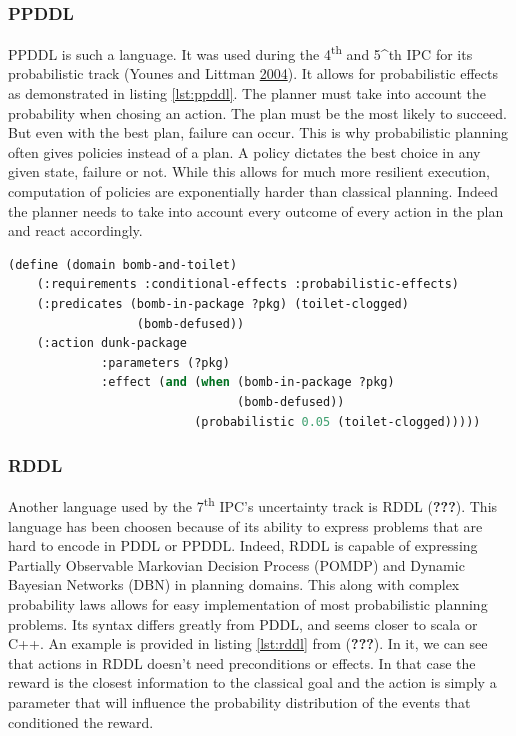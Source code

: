 \documentclass[11pt,a4paper,twoside,openright,titlepage,numbers=noenddot,headinclude,cleardoublepage=empty,openany]{scrreprt}
\theoremstyle{plain}
\theoremstyle{definition}
\theoremstyle{remark}
\begin{document}
\hypertarget{ppddl}{%
\subsubsection{PPDDL}\label{ppddl}}

PPDDL is such a language. It was used during the 4\textsuperscript{th}
and 5\^{}th IPC for its probabilistic track (Younes and Littman
\protect\hyperlink{ref-younes_ppddl_2004}{2004}). It allows for
probabilistic effects as demonstrated in listing \ref{lst:ppddl}. The
planner must take into account the probability when chosing an action.
The plan must be the most likely to succeed. But even with the best
plan, failure can occur. This is why probabilistic planning often gives
policies instead of a plan. A policy dictates the best choice in any
given state, failure or not. While this allows for much more resilient
execution, computation of policies are exponentially harder than
classical planning. Indeed the planner needs to take into account every
outcome of every action in the plan and react accordingly.

\begin{lstlisting}[language=Lisp, caption={Example of PPDDL use of probabilistic effects from Younes' paper.}, escapechar={$}, label=lst:ppddl]
(define (domain bomb-and-toilet)
    (:requirements :conditional-effects :probabilistic-effects)
    (:predicates (bomb-in-package ?pkg) (toilet-clogged)
                  (bomb-defused))
    (:action dunk-package
             :parameters (?pkg)
             :effect (and (when (bomb-in-package ?pkg)
                                (bomb-defused))
                          (probabilistic 0.05 (toilet-clogged)))))
\end{lstlisting}

\hypertarget{rddl}{%
\subsubsection{RDDL}\label{rddl}}

Another language used by the 7\textsuperscript{th} IPC's uncertainty
track is RDDL ({\textbf{???}}). This language has been choosen because
of its ability to express problems that are hard to encode in PDDL or
PPDDL. Indeed, RDDL is capable of expressing Partially Observable
Markovian Decision Process (POMDP) and Dynamic Bayesian Networks (DBN)
in planning domains. This along with complex probability laws allows for
easy implementation of most probabilistic planning problems. Its syntax
differs greatly from PDDL, and seems closer to scala or C++. An example
is provided in listing \ref{lst:rddl} from ({\textbf{???}}). In it, we
can see that actions in RDDL doesn't need preconditions or effects. In
that case the reward is the closest information to the classical goal
and the action is simply a parameter that will influence the probability
distribution of the events that conditioned the reward.
\end{document}
